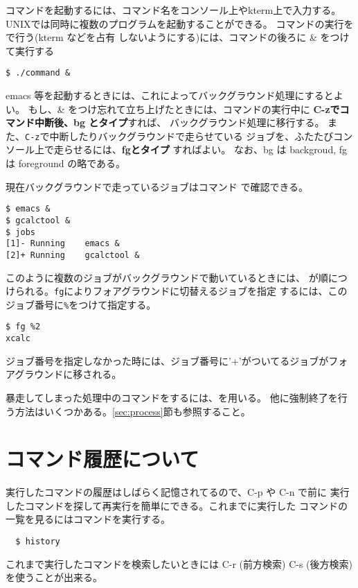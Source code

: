 \documentclass{jreport}
\begin{document}
コマンドを起動するには、コマンド名をコンソール上やkterm上で入力する。
UNIXでは同時に複数のプログラムを起動することができる。
コマンドの実行をで行う(kterm などを占有
しないようにする)には、コマンドの後ろに \& をつけて実行する
\begin{screen}
\begin{verbatim}
$ ./command &
\end{verbatim}
\end{screen}
emacs 等を起動するときには、これによってバックグラウンド処理にするとよい。
もし、\& をつけ忘れて立ち上げたときには、コマンドの実行中に
\textbf{C-zでコマンド中断後、bg とタイプ}すれば、
バックグラウンド処理に移行する。
また、\verb|C-z|で中断したりバックグラウンドで走らせている
ジョブを、ふたたびコンソール上で走らせるには、\textbf{fgとタイプ}
すればよい。
なお、bg は backgroud, fg は foreground の略である。

現在バックグラウンドで走っているジョブはコマンド
で確認できる。
\begin{screen}
\begin{verbatim}
$ emacs &
$ gcalctool &
$ jobs
[1]- Running    emacs &
[2]+ Running    gcalctool &
\end{verbatim}
\end{screen}
このように複数のジョブがバックグラウンドで動いているときには、
が順につけられる。\verb|fg|によりフォアグラウンドに切替えるジョブを指定
するには、このジョブ番号に\verb|%|をつけて指定する。
\begin{screen}
\begin{verbatim}
$ fg %2
xcalc
\end{verbatim}
\end{screen}
ジョブ番号を指定しなかった時には、ジョブ番号に'+'がついてるジョブがフォ
アグラウンドに移される。

暴走してしまった処理中のコマンドをするには、を用いる。
他に強制終了を行う方法はいくつかある。\ref{sec:process}節も参照すること。

\section{コマンド履歴について}

実行したコマンドの履歴はしばらく記憶されてるので、C-p や C-n で前に
実行したコマンドを探して再実行を簡単にできる。これまでに実行した
コマンドの一覧を見るにはコマンドを実行する。
\begin{screen}
\begin{verbatim}
  $ history
\end{verbatim}
\end{screen}
これまで実行したコマンドを検索したいときには
C-r (前方検索) C-s (後方検索)を使うことが出来る。
\end{document}
